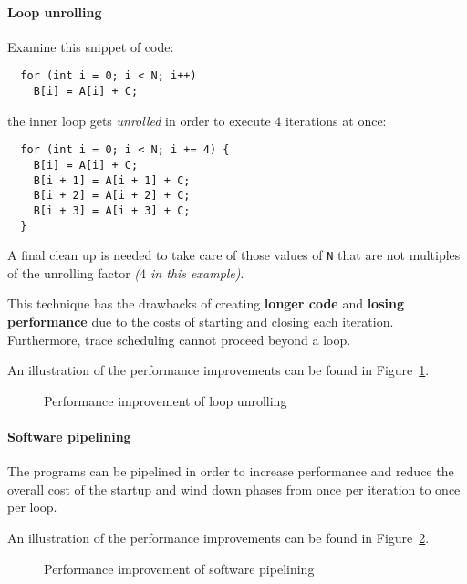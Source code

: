 \documentclass[english]{article}
\begin{document}
\paragraph{Loop unrolling}
\label{par:loop-unrolling}

Examine this snippet of code:

\begin{verbatim}
  for (int i = 0; i < N; i++)
    B[i] = A[i] + C;
\end{verbatim}

the inner loop gets \textit{unrolled} in order to execute \(4\) iterations at once:

\begin{verbatim}
  for (int i = 0; i < N; i += 4) {
    B[i] = A[i] + C;
    B[i + 1] = A[i + 1] + C;
    B[i + 2] = A[i + 2] + C;
    B[i + 3] = A[i + 3] + C;
  }
\end{verbatim}

A final clean up is needed to take care of those values of \texttt{N} that are not multiples of the unrolling factor \textit{(\(4\) in this example)}.

This technique has the drawbacks of creating \textbf{longer code} and \textbf{losing performance} due to the costs of starting and closing each iteration.
Furthermore, trace scheduling cannot proceed beyond a loop.

\bigskip
An illustration of the performance improvements can be found in Figure~\ref{fig:performance-improvement-loop-unrolling}.

\begin{figure}[htbp]
  \bigskip
  \centering
  \caption{Performance improvement of loop unrolling}
  \label{fig:performance-improvement-loop-unrolling}
  \bigskip
\end{figure}

\paragraph{Software pipelining}
\label{par:software-pipelining}

The programs can be pipelined in order to increase performance and reduce the overall cost of the startup and wind down phases from once per iteration to once per loop.

\bigskip
An illustration of the performance improvements can be found in Figure~\ref{fig:performance-improvement-software-pipelining}.

\begin{figure}[htbp]
  \bigskip
  \centering
  \caption{Performance improvement of software pipelining}
  \label{fig:performance-improvement-software-pipelining}
  \bigskip
\end{figure}
\end{document}
